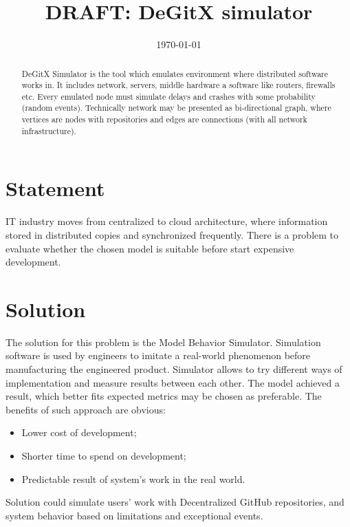 \documentclass[12pt,oneside]{article}
\date{\small\today}
\title{%
                        DRAFT: DeGitX simulator \\
                        \colorbox{firebrick}{\small\sffamily\color{white}{White Paper}}}
\begin{document}
                      \raggedbottom

                      \maketitle
                      \begin{abstract}
                      DeGitX Simulator is the tool which emulates environment where distributed software works in. It includes network, servers, middle hardware a software like routers, firewalls etc. Every emulated node must simulate delays and crashes with some probability (random events). Technically network may be presented as bi-directional graph, where vertices are nodes with repositories and edges are connections (with all network infrastructure).
                      \end{abstract}


                      \section{Statement}
                      IT industry moves from centralized to cloud architecture, where information stored in distributed copies and synchronized frequently. There is a problem to evaluate whether the chosen model is suitable before start expensive development.

                      \section{Solution}
                      The solution for this problem is the Model Behavior Simulator. Simulation software is used by engineers to imitate a real-world phenomenon before manufacturing the engineered product. Simulator allows to try different ways of implementation and measure results between each other. The model achieved a result, which better fits expected metrics may be chosen as preferable.
                      The benefits of such approach are obvious:
                      \begin{itemize}
                          \item Lower cost of development;
                          \item Shorter time to spend on development;
                          \item Predictable result of system's work in the real world.
                      \end{itemize}
                      Solution could simulate users' work with Decentralized GitHub repositories, and system behavior based on limitations and exceptional events.
\end{document}
